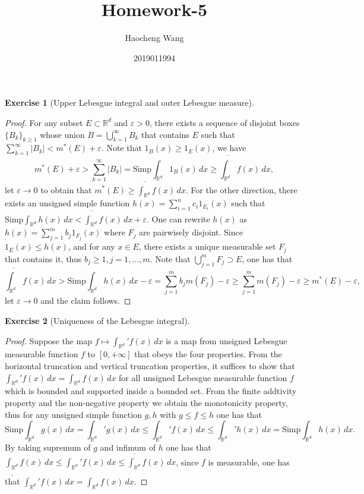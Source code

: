 \documentclass[a4paper]{article}
\title{Homework-5}
\author{Haocheng Wang \and 2019011994}
\newtheorem{ex}{Exercise}[subsection]
\begin{document}
\maketitle
\setcounter{ex}{11}
\begin{ex}[Upper Lebesgue integral and outer Lebesgue measure]\end{ex}
\begin{proof}
For any subset $E \subset \mathbb{R}^d$ and $\varepsilon > 0$, there exists a sequence of disjoint boxes $\{B_k\}_{k \geq 1}$ whose union 
$B = \bigcup_{k = 1}^\infty B_k$ that contains $E$ such that $\sum_{k = 1}^\infty |B_k| < m^*(E) + \varepsilon$.
Note that $1_B(x) \geq 1_E(x)$, we have $$
m^*(E) + \varepsilon > \sum_{k = 1}^\infty |B_k| = \mathrm{Simp}\int_{\mathbb{R}^d}1_B(x)\,dx \geq 
\overline{\int_{\mathbb{R}^d}}f(x)\,dx,
$$let $\varepsilon \to 0$ to obtain that $m^*(E) \geq \overline{\int_{\mathbb{R}^d}}f(x)\,dx$. For the other direction,
there exists an unsigned simple function $h(x) = \sum_{i = 1}^n c_i1_{E_i}(x)$ such that 
$\mathrm{Simp}\int_{\mathbb{R}^d} h(x)\, dx < \overline{\int_{\mathbb{R}^d}}f(x)\,dx + \varepsilon$. One can rewrite
$h(x)$ as $h(x) = \sum_{j = 1}^{m} b_j1_{F_j}(x)$ where $F_j$ are pairwisely disjoint. Since $1_E(x) \leq h(x)$, and
for any $x \in E$, there exists a unique measurable set $F_j$ that contains it, thus $b_j \geq 1, j = 1, \dots, m$.
Note that $\bigcup_{j = 1}^m F_j \supset E$, one has that $$
\overline{\int_{\mathbb{R}^d}}f(x)\,dx > \mathrm{Simp}\int_{\mathbb{R}^d}h(x)\,dx - \varepsilon = \sum_{j = 1}^m 
b_jm(F_j) - \varepsilon \geq \sum_{j = 1}^m m(F_j) - \varepsilon \geq m^*(E) - \varepsilon,
$$let $\varepsilon \to 0$ and the claim follows.
\end{proof}

\begin{ex}[Uniqueness of the Lebesgue integral]\end{ex}
\begin{proof}
Suppose the map $f \mapsto \int_{\mathbb{R}^d}'f(x)\,dx$ is a map from unsigned Lebesgue measurable function $f$ to
$[0, +\infty]$ that obeys the four properties. From the horizontal truncation and vertical truncation properties, 
it suffices to show that $\int_{\mathbb{R}^d}'f(x)\,dx = \int_{\mathbb{R}^d}f(x)\,dx$ for all unsigned Lebesgue 
measurable function $f$ which is bounded and supported inside a bounded set. From the finite addtivity property and 
the non-negative property we obtain the monotonicity property, thus for any unsigned simple function $g, h$ with 
$g \leq f \leq h$ one has that $$
\mathrm{Simp}\int_{\mathbb{R}^d} g(x)\,dx = \int_{\mathbb{R}^d}'g(x)\,dx \leq \int_{\mathbb{R}^d}'f(x)\,dx \leq 
\int_{\mathbb{R}^d}'h(x)\,dx = \mathrm{Simp}\int_{\mathbb{R}^d} h(x)\,dx.
$$By taking supremum of $g$ and infimum of $h$ one has that $\underline{\int_{\mathbb{R}^d}} f(x)\,dx \leq 
\int_{\mathbb{R}^d}'f(x)\,dx \leq \overline{\int_{\mathbb{R}^d}} f(x)\,dx$, since $f$ is measurable, one has that
$\int_{\mathbb{R}^d}'f(x)\,dx = \int_{\mathbb{R}^d}f(x)\,dx$.
\end{proof}
\end{document}
